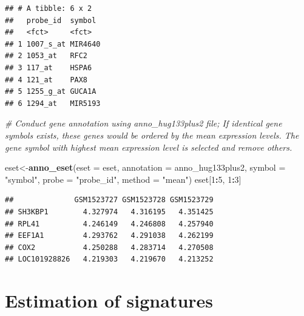 \documentclass[
  12pt,
]{book}
\newenvironment{Shaded}{\begin{snugshade}}{\end{snugshade}}
\newcommand{\AttributeTok}[1]{\textcolor[rgb]{0.13,0.29,0.53}{#1}}
\newcommand{\CommentTok}[1]{\textcolor[rgb]{0.56,0.35,0.01}{\textit{#1}}}
\newcommand{\DecValTok}[1]{\textcolor[rgb]{0.00,0.00,0.81}{#1}}
\newcommand{\FunctionTok}[1]{\textcolor[rgb]{0.13,0.29,0.53}{\textbf{#1}}}
\newcommand{\NormalTok}[1]{#1}
\newcommand{\OtherTok}[1]{\textcolor[rgb]{0.56,0.35,0.01}{#1}}
\newcommand{\SpecialCharTok}[1]{\textcolor[rgb]{0.81,0.36,0.00}{\textbf{#1}}}
\newcommand{\StringTok}[1]{\textcolor[rgb]{0.31,0.60,0.02}{#1}}
\begin{document}
\begin{verbatim}
## # A tibble: 6 x 2
##   probe_id  symbol 
##   <fct>     <fct>  
## 1 1007_s_at MIR4640
## 2 1053_at   RFC2   
## 3 117_at    HSPA6  
## 4 121_at    PAX8   
## 5 1255_g_at GUCA1A 
## 6 1294_at   MIR5193
\end{verbatim}

\begin{Shaded}
\begin{Highlighting}[]
\CommentTok{\# Conduct gene annotation using \textasciigrave{}anno\_hug133plus2\textasciigrave{} file; If identical gene symbols exists, these genes would be ordered by the mean expression levels. The gene symbol with highest mean expression level is selected and remove others. }

\NormalTok{eset}\OtherTok{\textless{}{-}}\FunctionTok{anno\_eset}\NormalTok{(}\AttributeTok{eset       =}\NormalTok{ eset,}
                \AttributeTok{annotation =}\NormalTok{ anno\_hug133plus2,}
                \AttributeTok{symbol     =} \StringTok{"symbol"}\NormalTok{,}
                \AttributeTok{probe      =} \StringTok{"probe\_id"}\NormalTok{,}
                \AttributeTok{method     =} \StringTok{"mean"}\NormalTok{)}
\NormalTok{eset[}\DecValTok{1}\SpecialCharTok{:}\DecValTok{5}\NormalTok{, }\DecValTok{1}\SpecialCharTok{:}\DecValTok{3}\NormalTok{]}
\end{Highlighting}
\end{Shaded}

\begin{verbatim}
##              GSM1523727 GSM1523728 GSM1523729
## SH3KBP1        4.327974   4.316195   4.351425
## RPL41          4.246149   4.246808   4.257940
## EEF1A1         4.293762   4.291038   4.262199
## COX2           4.250288   4.283714   4.270508
## LOC101928826   4.219303   4.219670   4.213252
\end{verbatim}

\hypertarget{estimation-of-signatures}{%
\section{Estimation of signatures}\label{estimation-of-signatures}}
\end{document}
